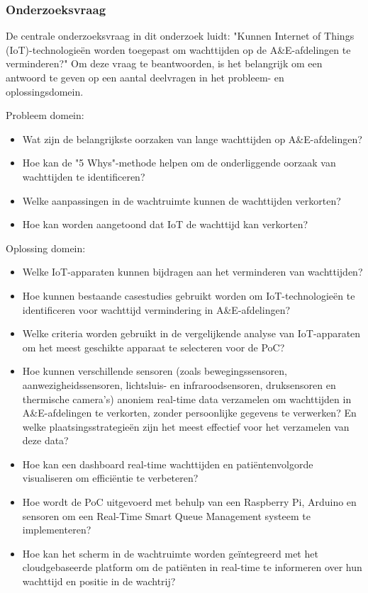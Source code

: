 \subsubsection*{Onderzoeksvraag}
De centrale onderzoeksvraag in dit onderzoek luidt: "Kunnen Internet of Things (IoT)-\-technologieën worden toegepast om wachttijden op de A\&E-afdelingen te verminderen?" Om deze vraag te beantwoorden, is het belangrijk om een antwoord te geven op een aantal deelvragen in het probleem- en oplossingsdomein. 

Probleem domein:
\begin{itemize}
    \item Wat zijn de belangrijkste oorzaken van lange wachttijden op A\&E-afdelingen?
    \item Hoe kan de "5 Whys"-methode helpen om de onderliggende oorzaak van wachttijden te identificeren?
    \item Welke aanpassingen in de wachtruimte kunnen de wachttijden verkorten?
    \item Hoe kan worden aangetoond dat IoT de wachttijd kan verkorten?
\end{itemize}


Oplossing domein:
\begin{itemize}
    \item Welke IoT-apparaten kunnen bijdragen aan het verminderen van wachttijden?
    \item Hoe kunnen bestaande casestudies gebruikt worden om IoT-technologieën te identificeren voor wachttijd vermindering in A\&E-afdelingen?
    \item Welke criteria worden gebruikt in de vergelijkende analyse van IoT-apparaten om het meest geschikte apparaat te selecteren voor de PoC?
    \item Hoe kunnen verschillende sensoren (zoals bewegingssensoren, aanwezigheidssensoren, lichtsluis- en infraroodsensoren, druksensoren en thermische camera’s) anoniem real-time data verzamelen om wachttijden in A\&E-afdelingen te verkorten, zonder persoonlijke gegevens te verwerken? En welke plaatsingsstrategieën zijn het meest effectief voor het verzamelen van deze data?
    \item Hoe kan een dashboard real-time wachttijden en patiëntenvolgorde visualiseren om efficiëntie te verbeteren?
    \item Hoe wordt de PoC uitgevoerd met behulp van een Raspberry Pi, Arduino en sensoren om een Real-Time Smart Queue Management systeem te implementeren? 
    \item Hoe kan het scherm in de wachtruimte worden geïntegreerd met het cloudgebaseerde platform om de patiënten in real-time te informeren over hun wachttijd en positie in de wachtrij?
\end{itemize}


